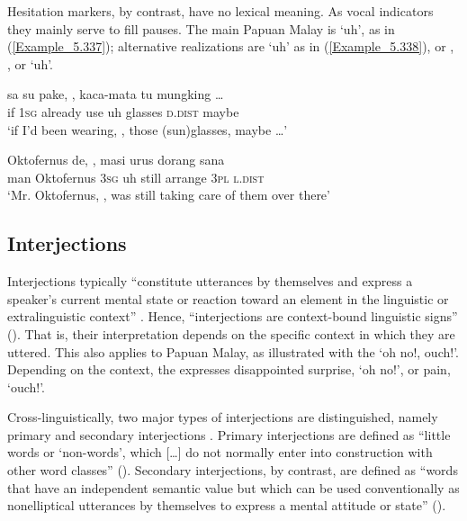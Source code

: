 Hesitation markers, by contrast, have no lexical meaning. As vocal indicators they mainly serve to fill pauses. The main Papuan Malay  is  ‘uh’, as in (\ref{Example_5.337}); alternative realizations are  ‘uh’ as in (\ref{Example_5.338}), or , , or  ‘uh’.


\ea
\label{Example_5.337}
 {sa} {su} {pake,} {,} {kaca-mata} {tu} {mungking} {{\ldots}}\\ %
 if  \textsc{1sg}  already  use  uh  glasses  \textsc{d.dist}  maybe  \\
\glt 
‘if I’d been wearing, , those (sun)glasses, maybe {\ldots}’ \textstyleExampleSource{[080919-005-Cv.0007]}
\z

\ea
\label{Example_5.338}
 {Oktofernus} {de,} {,} {masi} {urus} {dorang} {sana}\\ %
 man  Oktofernus  \textsc{3sg}  uh  still  arrange  \textsc{3pl}  \textsc{l.dist}\\
\glt
‘Mr. Oktofernus, , was still taking care of them over there’ \textstyleExampleSource{[081025-008-Cv.0121]}
\z


\subsection{Interjections}
\label{Para_5.13.3}
Interjections typically “constitute utterances by themselves and express a speaker’s current mental state or reaction toward an element in the linguistic or extralinguistic context” \citep[743]{Ameka.2006}. Hence, “interjections are context-bound linguistic signs” (\citeyear*[743]{Ameka.2006}). That is, their interpretation depends on the specific context in which they are uttered. This also applies to Papuan Malay, as illustrated with the   ‘oh no!, ouch!’. Depending on the context, the  expresses disappointed surprise, ‘oh no!’, or pain, ‘ouch!’.

Cross-linguistically, two major types of interjections are distinguished, namely primary and secondary interjections \citep{Ameka.2006}. Primary interjections are defined as “little words or ‘non-words’, which [{\ldots}] do not normally enter into construction with other word classes” (\citeyear*[744]{Ameka.2006}). Secondary interjections, by contrast, are defined as “words that have an independent semantic value but which can be used conventionally as nonelliptical utterances by themselves to express a mental attitude or state” (\citeyear*[744]{Ameka.2006}).

